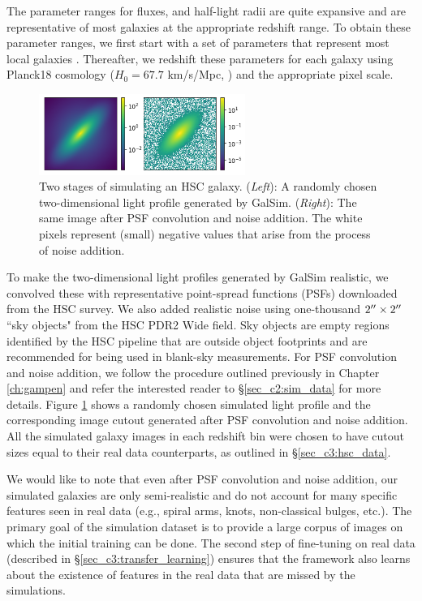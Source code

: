 The parameter ranges for fluxes, and half-light radii are quite expansive and are representative of most galaxies at the appropriate redshift range. To obtain these parameter ranges, we first start with a set of parameters that represent most local galaxies \citep{binney_and_merrifield}. Thereafter, we redshift these parameters for each galaxy using Planck18 cosmology ($H_0=67.7$ km/s/Mpc, \citealp{planck18}) and the appropriate pixel scale.

\begin{figure}[htb]
    \centering
    \includegraphics[width = 0.6\textwidth]{sim_process.png}
    \caption{Two stages of simulating an HSC galaxy. (\textit{Left}): A randomly chosen two-dimensional light profile generated by GalSim. (\textit{Right}): The same image after PSF convolution and noise addition. The white pixels represent (small) negative values that arise from the process of noise addition.}
    \label{fig_c3:sim_process}
\end{figure}

To make the two-dimensional light profiles generated by GalSim realistic, we convolved these with representative point-spread functions (PSFs) downloaded from the HSC survey. We also added realistic noise using one-thousand $2\mbox{$^{\prime\prime}$}\times2\mbox{$^{\prime\prime}$}$ ``sky objects" from the HSC PDR2 Wide field. Sky objects are empty regions identified by the HSC pipeline that are outside object footprints and are recommended for being used in blank-sky measurements. For PSF convolution and noise addition, we follow the procedure outlined previously in Chapter \ref{ch:gampen} and refer the interested reader to \S \ref{sec_c2:sim_data} for more details. Figure \ref{fig_c3:sim_process} shows a randomly chosen simulated light profile and the corresponding image cutout generated after PSF convolution and noise addition. All the simulated galaxy images in each redshift bin were chosen to have cutout sizes equal to their real data counterparts, as outlined in \S \ref{sec_c3:hsc_data}. 

We would like to note that even after PSF convolution and noise addition, our simulated galaxies are only semi-realistic and do not account for many specific features seen in real data (e.g., spiral arms, knots, non-classical bulges, etc.). The primary goal of the simulation dataset is to provide a large corpus of images on which the initial training can be done. The second step of fine-tuning \gampen{} on real data (described in \S \ref{sec_c3:transfer_learning}) ensures that the framework also learns about the existence of features in the real data that are missed by the simulations.

